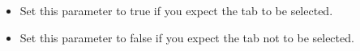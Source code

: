 
\begin{itemize}
\item Set this parameter to true if you expect the tab to be selected.
\item Set this parameter to false if you expect the tab not to be selected.
\end{itemize}
